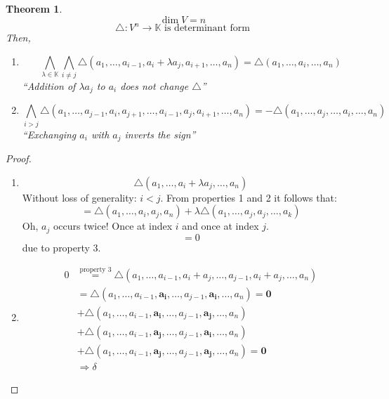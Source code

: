 \documentclass[a4paper,landscape,twocolumn]{article}
\newtheorem{theorem}{Theorem}
\begin{document}
\begin{theorem}
  \[ \dim{V} = n \]
  \[ \triangle: V^n \to \mathbb K \text{ is determinant form} \]
  Then,
  \begin{enumerate}
    \item[4.]
      \[
        \bigwedge_{\lambda \in \mathbb K} \bigwedge_{i \neq j}
        \triangle(a_1, \ldots, a_{i-1}, a_{i} + \lambda a_j, a_{i+1}, \ldots, a_n)
        = \triangle(a_1, \ldots, a_i, \ldots, a_n)
      \]
      \enquote{Addition of $\lambda a_j$ to $a_i$ does not change $\triangle$}
    \item[5.]
      \[
        \bigwedge_{i>j} \triangle(a_1, \ldots, a_{j-1}, a_i, a_{j+1}, \ldots, a_{i-1}, a_j, a_{i+1}, \ldots, a_n)
        = -\triangle (a_1, \ldots, a_j, \ldots, a_i, \ldots, a_n)
      \]
      \enquote{Exchanging $a_i$ with $a_j$ inverts the sign}
  \end{enumerate}
\end{theorem}
\begin{proof}
  \begin{enumerate}
    \item[4.]
      \[
        \triangle(a_1, \ldots, a_i + \lambda a_j, \ldots, a_n)
      \]
      Without loss of generality: $i < j$.
      From properties 1 and 2 it follows that:
      \[
        = \triangle (a_1, \ldots, a_i, a_j, a_n)
        + \lambda \triangle(a_1, \ldots, a_j, a_j, \ldots, a_k)
      \]
      Oh, $a_j$ occurs twice! Once at index $i$ and once at index $j$.
      \[ = 0 \]
      due to property 3.
    \item[5.]
      \begin{align*}
        0 &\stackrel{\text{property~3}}= \triangle (a_1, \ldots, a_{i-1}, a_i + a_j, \ldots, a_{j-1}, a_i + a_j, \ldots, a_n) \\
          &= \triangle(a_1, \ldots, a_{i-1}, \mathbf{a_i}, \ldots, a_{j-1}, \mathbf{a_i}, \ldots, a_n) \mathbf{= 0} \\
          &+ \triangle(a_1, \ldots, a_{i-1}, \mathbf{a_i}, \ldots, a_{j-1}, \mathbf{a_j}, \ldots, a_n) \\
          &+ \triangle(a_1, \ldots, a_{i-1}, \mathbf{a_j}, \ldots, a_{j-1}, \mathbf{a_i}, \ldots, a_n) \\
          &+ \triangle(a_1, \ldots, a_{i-1}, \mathbf{a_j}, \ldots, a_{j-1}, \mathbf{a_j}, \ldots, a_n) \mathbf{= 0} \\
          &\Rightarrow \delta
      \end{align*}
  \end{enumerate}
\end{proof}
\end{document}
